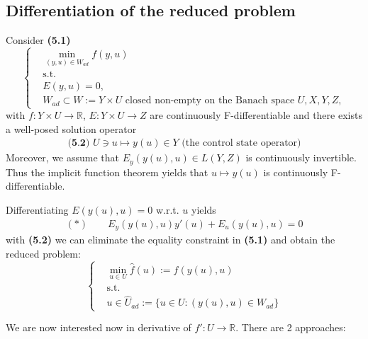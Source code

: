 \documentclass[a4paper,11pt,fleqn]{book}
\theoremstyle{definition}
\theoremstyle{remark}
\begin{document}
\subsection{Differentiation of the reduced problem}
Consider \textbf{(5.1)}
\begin{equation}
\left\{	
\begin{aligned}
	&\min_{(y, u) \in W_{ad}} f(y, u) \quad\\
	&\text{s.t.}\\
	&E(y, u) = 0,\\
	&W_{ad} \subset W:= Y \times U \text{ closed non-empty on the Banach space } U, X, Y, Z, 
\end{aligned}
\right.
\end{equation}
with $f:Y \times U \rightarrow \mathbb{R}$, $E: Y \times U \rightarrow Z$ are continuously F-differentiable and there exists a well-posed solution operator
\begin{align*}\textbf{(5.2) }
	U \ni u \mapsto y(u)\in Y \text{ (the control state operator)}
\end{align*}
Moreover, we assume that $E_y(y(u), u) \in L(Y, Z)$ is continuously invertible. Thus the implicit function theorem yields that $u \mapsto y(u)$ is continuously F-differentiable. \par 
Differentiating $E(y(u), u) = 0$ w.r.t. $u$ yields
\begin{align*}
	(*) \qquad
	E_y(y(u), u) y'(u)+ E_u(y(u), u) = 0
\end{align*}
with \textbf{(5.2)} we can eliminate the equality constraint in \textbf{(5.1)} and obtain the reduced problem:
\begin{equation}
\left\{
\begin{aligned}
	&\min_{u \in U} \hat{f}(u):= f(y(u), u)\\
	&\text{s.t.}\\
	& u \in \hat{U}_{ad}:= \{u \in U:(y(u), u) \in W_{ad} \}
\end{aligned}
\right.
\end{equation}

We are now interested now in derivative of $\hat{f}': U \rightarrow \mathbb{R}$. There are 2 approaches:
\end{document}
